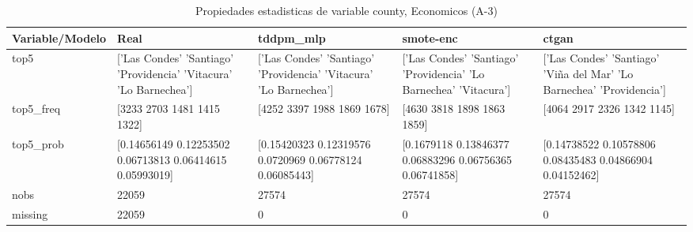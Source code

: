 \begin{table}[H]
\centering
\fontsize{8}{14}\selectfont
\caption{Propiedades  estadisticas de variable county, Economicos (A-3)}
\label{table-stats-economicos-a-3-county}
\begin{tabular}{|l|m{10em}|m{10em}|m{10em}|m{10em}|}
\hline
 \rowcolor[gray]{0.8}
Variable/Modelo & Real & tddpm\_mlp & smote-enc & ctgan \\
\hline top5 & ['Las Condes' 'Santiago' 'Providencia' 'Vitacura' 'Lo Barnechea'] & ['Las Condes' 'Santiago' 'Providencia' 'Vitacura' 'Lo Barnechea'] & ['Las Condes' 'Santiago' 'Providencia' 'Lo Barnechea' 'Vitacura'] & ['Las Condes' 'Santiago' 'Viña del Mar' 'Lo Barnechea' 'Providencia'] \\
\hline top5\_freq & [3233 2703 1481 1415 1322] & [4252 3397 1988 1869 1678] & [4630 3818 1898 1863 1859] & [4064 2917 2326 1342 1145] \\
\hline top5\_prob & [0.14656149 0.12253502 0.06713813 0.06414615 0.05993019] & [0.15420323 0.12319576 0.0720969  0.06778124 0.06085443] & [0.1679118  0.13846377 0.06883296 0.06756365 0.06741858] & [0.14738522 0.10578806 0.08435483 0.04866904 0.04152462] \\
\hline nobs & 22059 & 27574 & 27574 & 27574 \\
\hline missing & 22059 & 0 & 0 & 0 \\
\hline
\end{tabular}
\end{table}
